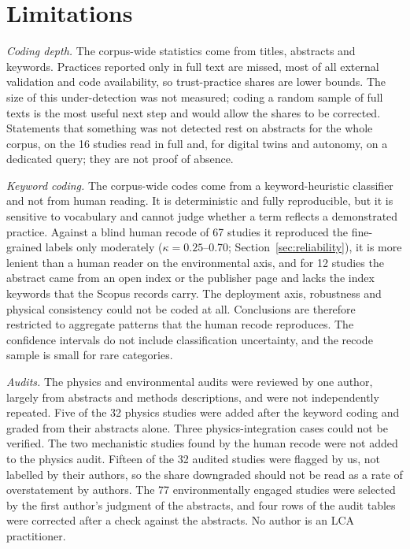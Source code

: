 \documentclass[pdflatex,sn-basic]{sn-jnl}
\begin{document}
\section{Limitations}\label{sec:limits}

\emph{Coding depth.} The corpus-wide statistics come from titles, abstracts and keywords. Practices reported only in full text are missed, most of all external validation and code availability, so trust-practice shares are lower bounds. The size of this under-detection was not measured; coding a random sample of full texts is the most useful next step and would allow the shares to be corrected. Statements that something was not detected rest on abstracts for the whole corpus, on the 16 studies read in full and, for digital twins and autonomy, on a dedicated query; they are not proof of absence.

\emph{Keyword coding.} The corpus-wide codes come from a keyword-heuristic classifier and not from human reading. It is deterministic and fully reproducible, but it is sensitive to vocabulary and cannot judge whether a term reflects a demonstrated practice. Against a blind human recode of 67 studies it reproduced the fine-grained labels only moderately ($\kappa = 0.25$--0.70; Section~\ref{sec:reliability}), it is more lenient than a human reader on the environmental axis, and for 12 studies the abstract came from an open index or the publisher page and lacks the index keywords that the Scopus records carry. The deployment axis, robustness and physical consistency could not be coded at all. Conclusions are therefore restricted to aggregate patterns that the human recode reproduces. The confidence intervals do not include classification uncertainty, and the recode sample is small for rare categories.

\emph{Audits.} The physics and environmental audits were reviewed by one author, largely from abstracts and methods descriptions, and were not independently repeated. Five of the 32 physics studies were added after the keyword coding and graded from their abstracts alone. Three physics-integration cases could not be verified. The two mechanistic studies found by the human recode were not added to the physics audit. Fifteen of the 32 audited studies were flagged by us, not labelled by their authors, so the share downgraded should not be read as a rate of overstatement by authors. The 77 environmentally engaged studies were selected by the first author's judgment of the abstracts, and four rows of the audit tables were corrected after a check against the abstracts. No author is an LCA practitioner.
\end{document}
